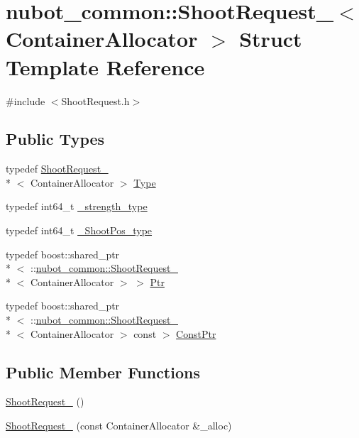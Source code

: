 \hypertarget{structnubot__common_1_1ShootRequest__}{\section{nubot\-\_\-common\-:\-:Shoot\-Request\-\_\-$<$ Container\-Allocator $>$ Struct Template Reference}
\label{structnubot__common_1_1ShootRequest__}
}


{\ttfamily \#include $<$Shoot\-Request.\-h$>$}

\subsection*{Public Types}
\begin{DoxyCompactItemize}
\item 
typedef \hyperlink{structnubot__common_1_1ShootRequest__}{Shoot\-Request\-\_\-}\\*
$<$ Container\-Allocator $>$ \hyperlink{structnubot__common_1_1ShootRequest___aaf26ccf95c5cb56763cb643600f92005}{Type}
\item 
typedef int64\-\_\-t \hyperlink{structnubot__common_1_1ShootRequest___aceb6973d9856654d66059200ff022559}{\-\_\-strength\-\_\-type}
\item 
typedef int64\-\_\-t \hyperlink{structnubot__common_1_1ShootRequest___af89baff72c64a8aca97ad5a84dd2a0bf}{\-\_\-\-Shoot\-Pos\-\_\-type}
\item 
typedef boost\-::shared\-\_\-ptr\\*
$<$ \-::\hyperlink{structnubot__common_1_1ShootRequest__}{nubot\-\_\-common\-::\-Shoot\-Request\-\_\-}\\*
$<$ Container\-Allocator $>$ $>$ \hyperlink{structnubot__common_1_1ShootRequest___a1a4dc93f8b0e5bf5048e6f6b79dd495f}{Ptr}
\item 
typedef boost\-::shared\-\_\-ptr\\*
$<$ \-::\hyperlink{structnubot__common_1_1ShootRequest__}{nubot\-\_\-common\-::\-Shoot\-Request\-\_\-}\\*
$<$ Container\-Allocator $>$ const  $>$ \hyperlink{structnubot__common_1_1ShootRequest___a74600e71443214b0448f619b94065e3d}{Const\-Ptr}
\end{DoxyCompactItemize}
\subsection*{Public Member Functions}
\begin{DoxyCompactItemize}
\item 
\hyperlink{structnubot__common_1_1ShootRequest___a3e20c2ca1551c8a67a9873ab88aadb2a}{Shoot\-Request\-\_\-} ()
\item 
\hyperlink{structnubot__common_1_1ShootRequest___aca382383b574e90d03d4cfc61c81fb1c}{Shoot\-Request\-\_\-} (const Container\-Allocator \&\-\_\-alloc)
\end{DoxyCompactItemize}
